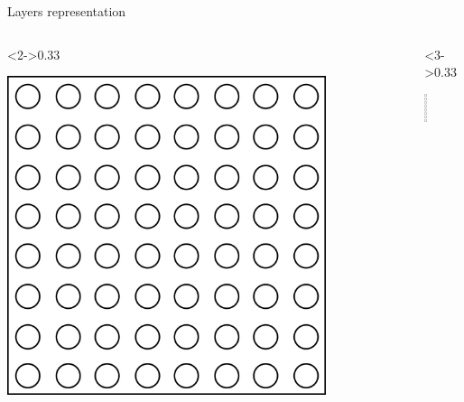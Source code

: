 \documentclass[xcolor=pdftex,dvipsnames,table,mathserif]{beamer}
\begin{document}
\begin{frame}{Layers representation}
\begin{columns}
    \begin{column}<2->{0.33\textwidth}
      \begin{center}
        \includegraphics[width=0.80\textwidth]{cnn_neurones.png}

      \end{center}
    \end{column}

    \begin{column}<3->{0.33\textwidth}
      \begin{center}
        \includegraphics[width=0.07\textwidth]{col.png}

      \end{center}
    \end{column}

  \end{columns}


\end{frame}
\end{document}
